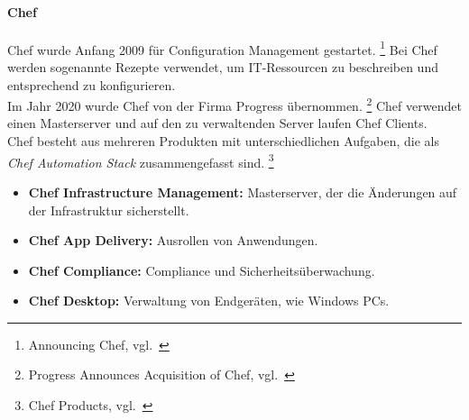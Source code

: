 \paragraph{Chef}\label{iac_tools_tools_chef}


Chef wurde Anfang 2009 für Configuration Management gestartet. \footnote{{Announcing Chef, vgl.~\cite{CHEF_ANNOUNCEMENT}}}
Bei Chef werden sogenannte Rezepte verwendet, um IT-Ressourcen zu beschreiben und entsprechend zu konfigurieren. \\
Im Jahr 2020 wurde Chef von der Firma Progress übernommen. \footnote{{Progress Announces Acquisition of Chef, vgl.~\cite{CHEF_PROGRESS}}}
Chef verwendet einen Masterserver und auf den zu verwaltenden Server laufen Chef Clients. \\

Chef besteht aus mehreren Produkten mit unterschiedlichen Aufgaben, die als \textit{Chef Automation Stack} zusammengefasst sind. \footnote{{Chef Products, vgl.~\cite{CHEF_PRODUCTS}}}

\begin{itemize}
    \item \textbf{Chef Infrastructure Management:}
    Masterserver, der die Änderungen auf der Infrastruktur sicherstellt.

    \item \textbf{Chef App Delivery:}
    Ausrollen von Anwendungen.

    \item \textbf{Chef Compliance:}
    Compliance und Sicherheitsüberwachung.

    \item \textbf{Chef Desktop:}
    Verwaltung von Endgeräten, wie Windows PCs.
\end{itemize}
